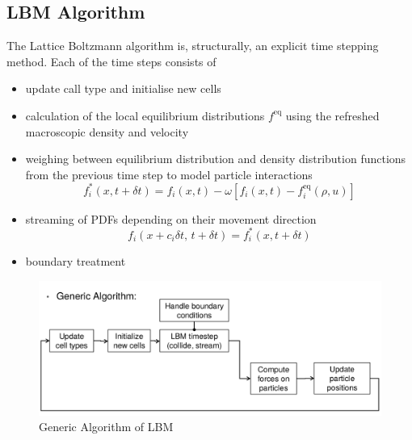 \subsection{LBM Algorithm} \label{sec:LBM_algorithm}
	The Lattice Boltzmann algorithm is, structurally, an explicit time stepping method. Each of the time steps consists of
	\begin{itemize}
		\item update call type and initialise new cells
		
		\item calculation of the local equilibrium distributions
		$f^{\mathrm{eq}}$ using the refreshed macroscopic density and velocity
		\item weighing between equilibrium distribution and density
		distribution functions from the previous time step
		to model particle interactions
		\begin{equation}
		\label{eq:LBMalgorithm1}
		f_i^*(x , t + \delta t) = f_i(x, t)
		- \omega [f_i(x, t) - f_i^{\mathrm{eq}}(\rho, u)]
		\end{equation}

		\item streaming of PDFs depending on their movement direction
		\begin{equation}
		\label{eq:LBMalgorithm2}
		f_i(x + c_i \delta t,\, t + \delta t) = f_i^*(x , t + \delta t)
		\end{equation}

		\item boundary treatment
	\end{itemize}
	
	\begin{figure}[ht]
		\centering
		\includegraphics[scale=0.25]{img/LBM/generic_algorithm.png}
		\caption{Generic Algorithm of LBM}
		\label{fig: LBMGeneric_algorithm}
	\end{figure} 
	
